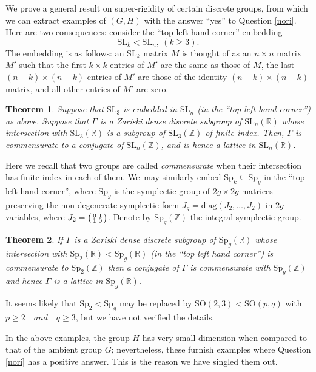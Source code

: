 \documentclass[JEP,XML,SOM,Unicode,published]{cedram}
\newenvironment{smallpmatrix}{\big(\begin{smallmatrix}}{\end{smallmatrix}\big)}
\newcommand{\SO}{\mathrm{SO}}
\newtheorem{theorem}{Theorem}
\theoremstyle{definition}
\newcommand{\field}[1]{\mathbb{#1}}
\newcommand{\R}{\field{R}}
\newcommand{\Z}{\field{Z}}
\newcommand{\SL}{\mathrm{SL}}
\newcommand{\Sp}{\mathrm{Sp}}
\begin{document}
We prove a general result on super-rigidity of certain discrete groups, from which we can extract examples of $(G,H)$ with the answer ``yes'' to Question \ref{nori}. Here are two consequences: consider the ``top left hand corner'' embedding
\[
\SL_k< \SL_n, ~(k\geq 3).
\]
The embedding is as follows: an $\SL_k$ matrix $M$ is thought of as an $n\times n$ matrix~$M'$ such
that the first $k\times k$ entries of $M'$ are the same as those of $M$, the last $(n-k)\times (n-k)$ entries of $M'$ are those of the identity $(n-k)\times (n-k)$ matrix, and all other entries of $M'$ are zero.

\begin{theorem}\label{spllinear} Suppose that $\SL_3$ is embedded in
$\SL_n$ (in the ``top left hand corner'') as above. Suppose that
$\Gamma$ is a Zariski dense discrete subgroup of $\SL_n(\R)$ whose
intersection with $\SL_3(\R)$ is a subgroup of $\SL_3(\Z)$ of finite
index. Then, $\Gamma $ is commensurate to a conjugate of $\SL_n(\Z)$,
and is hence a lattice in $\SL_n(\R)$.
\end{theorem}

Here we recall that two groups are called \emph{commensurate} when their intersection has finite index in each of them. We~may similarly embed $\Sp_k\subseteq \Sp_g$ in the ``top left hand corner'', where $\Sp_g$ is the symplectic group of $2g\times 2g$-matrices preserving the non-degenerate symplectic form $J_g=\mathrm{diag}(J_2,\dots,J_2)$ in
$2g$-variables, where $J_2=\begin{smallpmatrix}0&1 \\ 1&0\end{smallpmatrix}$. Denote by $\Sp_g(\Z)$ the integral symplectic group.

\begin{theorem}\label{symplectic} If $\Gamma $ is a Zariski dense
discrete subgroup of $\Sp_g(\R)$ whose intersection with $\Sp_2(\R)<\Sp_g(\R)$ (in the ``top left hand corner'') is
commensurate to $\Sp_2(\Z)$ then a conjugate of $\Gamma $ is
commensurate with $\Sp_g(\Z)$ and hence $\Gamma $ is a lattice in
$\Sp_g(\R)$.
\end{theorem}

It seems likely that $\Sp_2 < \Sp_g$ may be replaced by $\SO(2,3) < \SO(p,q)$ with $p \geq 2 \quad and \quad q \geq 3$, but we have not verified the details.

In the above examples, the group $H$ has very small dimension when compared to that of the ambient group $G$; nevertheless, these furnish examples where Question \ref{nori} has a positive answer. This is the reason we have singled them out.
\end{document}
